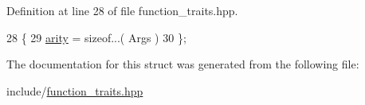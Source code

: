 Definition at line 28 of file function\+\_\+traits.\+hpp.


\begin{DoxyCode}
28              \{
29             \hyperlink{structfn__traits_1_1function__traits_3_01_r_07_args_8_8_8_08_4_aafde9521d9646c97b984646d8273dd3ba2f612b5524050ab8d6ab3d54d52dbbb0}{arity} = \textcolor{keyword}{sizeof}...( Args )
30         \};
\end{DoxyCode}


The documentation for this struct was generated from the following file\+:\begin{DoxyCompactItemize}
\item 
include/\hyperlink{function__traits_8hpp}{function\+\_\+traits.\+hpp}\end{DoxyCompactItemize}
